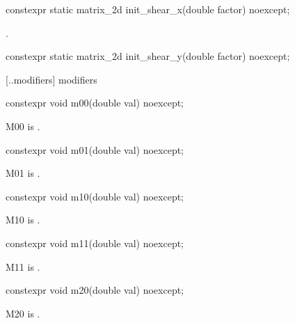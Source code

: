 %
\begin{itemdecl}
constexpr static matrix_2d init_shear_x(double factor) noexcept;
\end{itemdecl}
\begin{itemdescr}
\pnum
\returns
{}.
\end{itemdescr}

%
\begin{itemdecl}
constexpr static matrix_2d init_shear_y(double factor) noexcept;
\end{itemdecl}
\begin{itemdescr}
\pnum
\returns
{}
\end{itemdescr}

 [\iotwod.\matrixtwod.modifiers] { modifiers}

%
\begin{itemdecl}
constexpr void m00(double val) noexcept;
\end{itemdecl}
\begin{itemdescr}
\pnum
\effects
M00 is .
\end{itemdescr}

%
\begin{itemdecl}
constexpr void m01(double val) noexcept;
\end{itemdecl}
\begin{itemdescr}
\pnum
\effects
M01 is .
\end{itemdescr}

%
\begin{itemdecl}
constexpr void m10(double val) noexcept;
\end{itemdecl}
\begin{itemdescr}
\pnum
\effects
M10 is .
\end{itemdescr}

%
\begin{itemdecl}
constexpr void m11(double val) noexcept;
\end{itemdecl}
\begin{itemdescr}
\pnum
\effects
M11 is .
\end{itemdescr}

%
\begin{itemdecl}
constexpr void m20(double val) noexcept;
\end{itemdecl}
\begin{itemdescr}
\pnum
\effects
M20 is .
\end{itemdescr}

